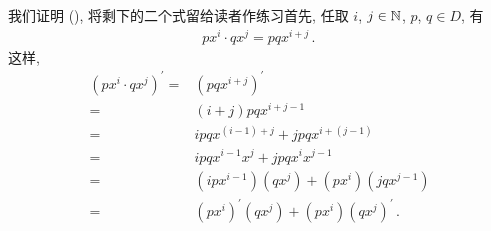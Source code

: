 \begin{pf}
    我们证明 (\myStar), 将剩下的二个式留给读者作练习\period 首先, 任取 $i$, $j \in \mathbb{N}$, $p$, $q \in D$, 有
    \begin{align*}
        px^i \cdot qx^j = pqx^{i+j} \period
    \end{align*}
    这样,
    \begin{align*}
        (px^i \cdot qx^j)^{\prime}
        = {} & (pqx^{i+j})^{\prime}                                    \\
        = {} & (i+j)pq x^{i+j-1}                                       \\
        = {} & ipq x^{(i-1)+j} + jpq x^{i+(j-1)}                       \\
        = {} & ipq x^{i-1} x^j + jpq x^i x^{j-1}                       \\
        = {} & (ipx^{i-1}) (qx^j) + (px^i) (jqx^{j-1})                 \\
        = {} & (px^i)^{\prime} (qx^j) + (px^i) (qx^j)^{\prime} \period
    \end{align*}


\end{pf}
